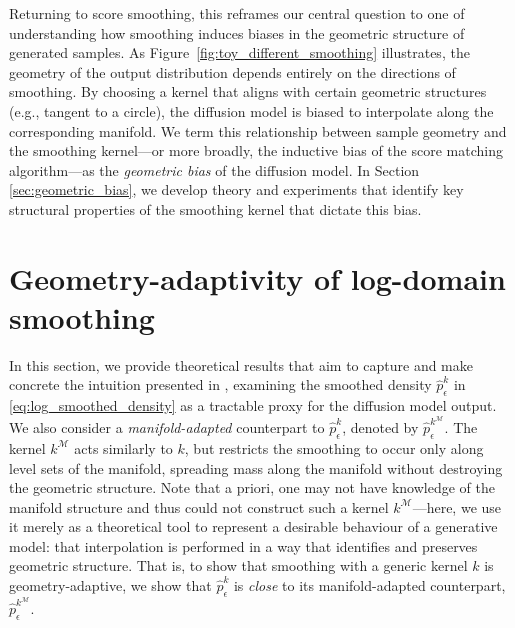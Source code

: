 \documentclass[10pt]{article}
\theoremstyle{plain}
\theoremstyle{definition}
\theoremstyle{remark}
\newcommand{\M}{{\mathcal{M}}}
\begin{document}
Returning to score smoothing, this reframes our central question to one of understanding how smoothing induces biases in the geometric structure of generated samples. As Figure~\ref{fig:toy_different_smoothing} illustrates, the geometry of the output distribution depends entirely on the directions of smoothing. By choosing a kernel that aligns with certain geometric structures (e.g., tangent to a circle), the diffusion model is biased to interpolate along the corresponding manifold. We term this relationship between sample geometry and the smoothing kernel---or more broadly, the inductive bias of the score matching algorithm---as the \emph{geometric bias} of the diffusion model. In Section \ref{sec:geometric_bias}, we develop theory and experiments that identify key structural properties of the smoothing kernel that dictate this bias.



































\section{Geometry-adaptivity of log-domain smoothing}\label{sec:geometry-adaptivity-of-log-domain-smoothing}

In this section, we provide theoretical results that aim to capture and make concrete the intuition presented in , examining the smoothed density $\hat{p}_\epsilon^k$ in \eqref{eq:log_smoothed_density} as a tractable proxy for the diffusion model output. We also consider a \textit{manifold-adapted} counterpart to $\hat{p}_\epsilon^k$, denoted by $\hat{p}_\epsilon^{k^\mathcal{M}}$. The kernel $k^\mathcal{M}$ acts similarly to $k$, but restricts the smoothing to occur only along level sets of the manifold, spreading mass along the manifold without destroying the geometric structure. Note that a priori, one may not have knowledge of the manifold structure and thus could not construct such a kernel $k^\M$---here, we use it merely as a theoretical tool to represent a desirable behaviour of a generative model: that interpolation is performed in a way that identifies and preserves geometric structure. That is, to show that smoothing with a generic kernel \(k\) is geometry-adaptive, we show that $\hat{p}_\epsilon^k$ is \textit{close} to its manifold-adapted counterpart, $\hat{p}_\epsilon^{k^\mathcal{M}}$.
\end{document}
